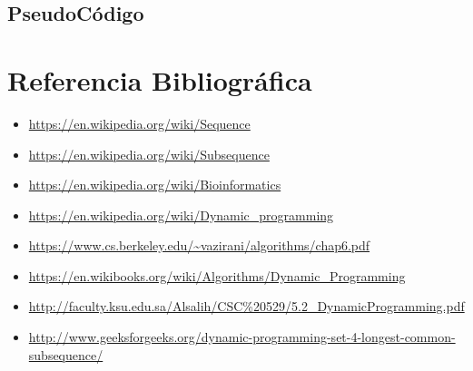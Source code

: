 \documentclass{article}
\begin{document}
		

		
		

	
	\subsection{PseudoCódigo}

\section{Referencia Bibliográfica}

	\begin{itemize}
		\item \url{https://en.wikipedia.org/wiki/Sequence}	
		\item \url{https://en.wikipedia.org/wiki/Subsequence}	
		\item \url{https://en.wikipedia.org/wiki/Bioinformatics}	
		\item \url{https://en.wikipedia.org/wiki/Dynamic_programming}	
		\item \url{https://www.cs.berkeley.edu/~vazirani/algorithms/chap6.pdf}	
		\item \url{https://en.wikibooks.org/wiki/Algorithms/Dynamic_Programming}	
		\item \url{http://faculty.ksu.edu.sa/Alsalih/CSC%20529/5.2_DynamicProgramming.pdf}	
		\item \url{http://www.geeksforgeeks.org/dynamic-programming-set-4-longest-common-subsequence/}	
		
		
		
	\end{itemize}
\end{document}
